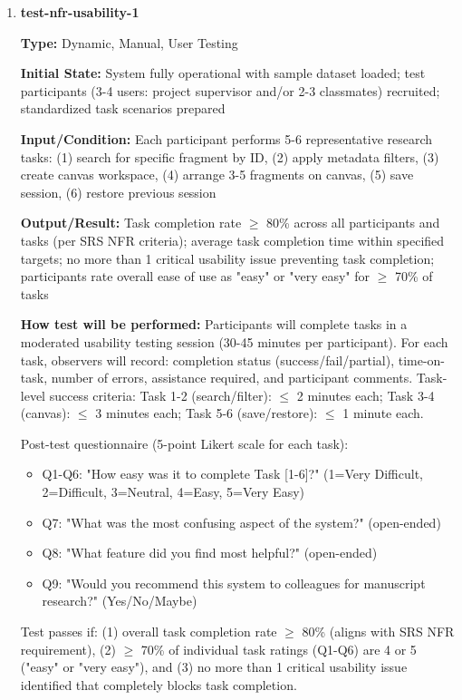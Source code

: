 \documentclass[12pt, titlepage]{article}
\begin{document}
\begin{enumerate}

\item \textbf{test-nfr-usability-1}

\textbf{Type:} Dynamic, Manual, User Testing

\textbf{Initial State:} System fully operational with sample dataset loaded; test participants (3-4 users: project supervisor and/or 2-3 classmates) recruited; standardized task scenarios prepared

\textbf{Input/Condition:} Each participant performs 5-6 representative research tasks: (1) search for specific fragment by ID, (2) apply metadata filters, (3) create canvas workspace, (4) arrange 3-5 fragments on canvas, (5) save session, (6) restore previous session

\textbf{Output/Result:} Task completion rate $\geq$ 80\% across all participants and tasks (per SRS NFR criteria); average task completion time within specified targets; no more than 1 critical usability issue preventing task completion; participants rate overall ease of use as "easy" or "very easy" for $\geq$ 70\% of tasks

\textbf{How test will be performed:} Participants will complete tasks in a moderated usability testing session (30-45 minutes per participant). For each task, observers will record: completion status (success/fail/partial), time-on-task, number of errors, assistance required, and participant comments. Task-level success criteria: Task 1-2 (search/filter): $\leq$ 2 minutes each; Task 3-4 (canvas): $\leq$ 3 minutes each; Task 5-6 (save/restore): $\leq$ 1 minute each.

Post-test questionnaire (5-point Likert scale for each task):
\begin{itemize}
\item Q1-Q6: "How easy was it to complete Task [1-6]?" (1=Very Difficult, 2=Difficult, 3=Neutral, 4=Easy, 5=Very Easy)
\item Q7: "What was the most confusing aspect of the system?" (open-ended)
\item Q8: "What feature did you find most helpful?" (open-ended)
\item Q9: "Would you recommend this system to colleagues for manuscript research?" (Yes/No/Maybe)
\end{itemize}

Test passes if: (1) overall task completion rate $\geq$ 80\% (aligns with SRS NFR requirement), (2) $\geq$ 70\% of individual task ratings (Q1-Q6) are 4 or 5 ("easy" or "very easy"), and (3) no more than 1 critical usability issue identified that completely blocks task completion.


\end{enumerate}
\end{document}

